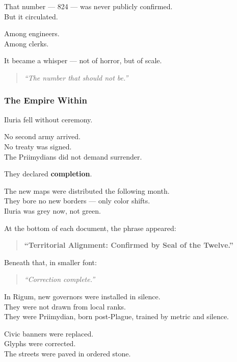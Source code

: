 \documentclass[12pt]{article}
\begin{document}
\vspace{1em}

That number — 824 — was never publicly confirmed.\\
But it circulated.

Among engineers.\\
Among clerks.

It became a whisper — not of horror, but of scale.

\begin{quote}
\textit{“The number that should not be.”}
\end{quote}

\dotfill

\subsubsection{The Empire Within}

Iluria fell without ceremony.

No second army arrived.\\
No treaty was signed.\\
The Priimydians did not demand surrender.

They declared \textbf{completion}.

\vspace{1em}

The new maps were distributed the following month.\\
They bore no new borders — only color shifts.\\
Iluria was grey now, not green.

At the bottom of each document, the phrase appeared:

\begin{quote}
\textbf{“Territorial Alignment: Confirmed by Seal of the Twelve.”}
\end{quote}

Beneath that, in smaller font:

\begin{quote}
\textit{“Correction complete.”}
\end{quote}

\vspace{1em}

In Rigum, new governors were installed in silence.\\
They were not drawn from local ranks.\\
They were Priimydian, born post-Plague, trained by metric and silence.

Civic banners were replaced.\\
Glyphs were corrected.\\
The streets were paved in ordered stone.
\end{document}
